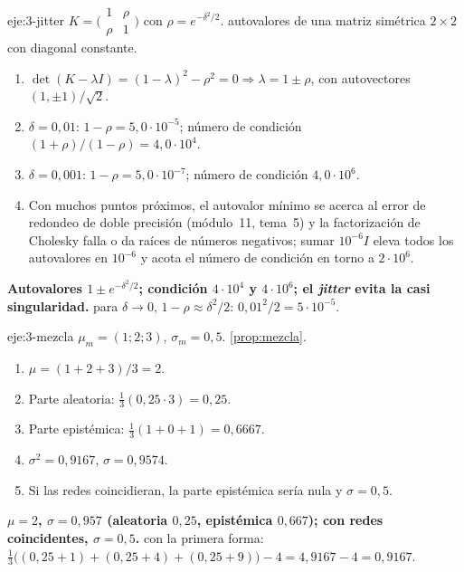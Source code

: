 \begin{solucion}{eje:3-jitter}
\datos $K=\bigl(\begin{smallmatrix}1&\rho\\\rho&1\end{smallmatrix}\bigr)$ con $\rho=e^{-\delta^2/2}$.
\planteamiento autovalores de una matriz simétrica $2\times2$ con diagonal constante.
\pasos
\begin{enumerate}[label=\arabic*.]
  \item $\det(K-\lambda I)=(1-\lambda)^2-\rho^2=0\Rightarrow\lambda=1\pm\rho$, con autovectores $(1,\pm1)/\sqrt2$.
  \item $\delta=0{,}01$: $1-\rho=5{,}0\cdot10^{-5}$; número de condición $(1+\rho)/(1-\rho)=4{,}0\cdot10^4$.
  \item $\delta=0{,}001$: $1-\rho=5{,}0\cdot10^{-7}$; número de condición $4{,}0\cdot10^6$.
  \item Con muchos puntos próximos, el autovalor mínimo se acerca al error de redondeo de doble precisión (módulo~11, tema~5) y la factorización de Cholesky falla o da raíces de números negativos; sumar $10^{-6}I$ eleva todos los autovalores en $10^{-6}$ y acota el número de condición en torno a $2\cdot10^6$.
\end{enumerate}
\resultado \textbf{Autovalores $1\pm e^{-\delta^2/2}$; condición $4\cdot10^4$ y $4\cdot10^6$; el \emph{jitter} evita la casi singularidad.}
\comprobacion para $\delta\to0$, $1-\rho\approx\delta^2/2$: $0{,}01^2/2=5\cdot10^{-5}$.
\end{solucion}

\begin{solucion}{eje:3-mezcla}
\datos $\mu_m=(1;2;3)$, $\sigma_m=0{,}5$.
\planteamiento \cref{prop:mezcla}.
\pasos
\begin{enumerate}[label=\arabic*.]
  \item $\mu=(1+2+3)/3=2$.
  \item Parte aleatoria: $\frac13(0{,}25\cdot3)=0{,}25$.
  \item Parte epistémica: $\frac13(1+0+1)=0{,}6667$.
  \item $\sigma^2=0{,}9167$, $\sigma=0{,}9574$.
  \item Si las redes coincidieran, la parte epistémica sería nula y $\sigma=0{,}5$.
\end{enumerate}
\resultado \textbf{$\mu=2$, $\sigma=0{,}957$ (aleatoria $0{,}25$, epistémica $0{,}667$); con redes coincidentes, $\sigma=0{,}5$.}
\comprobacion con la primera forma: $\frac13\bigl((0{,}25+1)+(0{,}25+4)+(0{,}25+9)\bigr)-4=4{,}9167-4=0{,}9167$.
\end{solucion}

